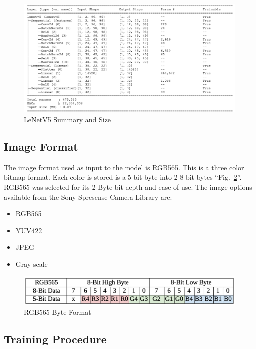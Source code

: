 \documentclass[conference]{IEEEtran}
\begin{document}
\begin{figure}[htbp]
\centerline{\includegraphics[scale=.22]{leNetV5.png}}
\caption{LeNetV5 Summary and Size}
\label{lenet}
\end{figure}

\subsection{Image Format}\label{AA}
The image format used as input to the model is RGB565. This is a three color bitmap format. 
Each color is stored is a 5-bit byte into 2 8 bit bytes ``Fig.~\ref{rgb565}''. RGB565 was selected for its 2 Byte bit depth and ease of use.
The image options available from the Sony Spresense Camera Library are:
\begin{itemize}
	\item RGB565
	\item YUV422
	\item JPEG
	\item Gray-scale
\end{itemize} 


\begin{figure}[htbp]
\centerline{\includegraphics[scale=.22]{RGB565.png}}
\caption{RGB565 Byte Format}
\label{rgb565}
\end{figure}

\subsection{Training Procedure}
\end{document}
